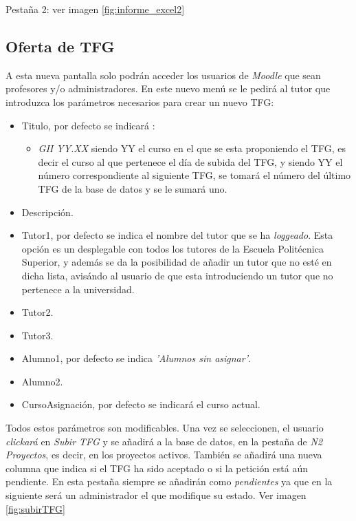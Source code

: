 Pestaña 2: ver imagen \ref{fig:informe_excel2}

\subsection{Oferta de TFG}

A esta nueva pantalla solo podrán acceder los usuarios de \emph{Moodle} que sean profesores y/o administradores.
En este nuevo menú se le pedirá al tutor que introduzca los parámetros necesarios para crear un nuevo TFG:

\begin{itemize}
	\item Titulo, por defecto se indicará :
	\begin{itemize}
		\item \emph{GII YY.XX} siendo YY el curso en el que se esta proponiendo el TFG, es decir el curso al que pertenece el día de subida del TFG, y siendo YY el número correspondiente al siguiente TFG, se tomará el número del último TFG de la base de datos y se le sumará uno.
	\end{itemize}
	\item Descripción.
	\item Tutor1, por defecto se indica el nombre del tutor que se ha \emph{loggeado}. Esta opción es un desplegable con todos los tutores de la Escuela Politécnica Superior, y además se da la posibilidad de añadir un tutor que no esté en dicha lista, avisándo al usuario de que esta introduciendo un tutor que no pertenece a la universidad.
	\item Tutor2.
	\item Tutor3.
	\item Alumno1, por defecto se indica \emph{'Alumnos sin asignar'}.
	\item Alumno2.
	\item CursoAsignación, por defecto se indicará el curso actual.
\end{itemize}

Todos estos parámetros son modificables. Una vez se seleccionen, el usuario \emph{clickará} en \emph{Subir TFG} y se añadirá a la base de datos, en la pestaña de \emph{N2 Proyectos}, es decir, en los proyectos activos.
También se añadirá una nueva columna que indica si el TFG ha sido aceptado o si la petición está aún pendiente. En esta pestaña siempre se añadirán como \emph{pendientes} ya que en la siguiente será un administrador el que modifique su estado. Ver imagen \ref{fig:subirTFG}

